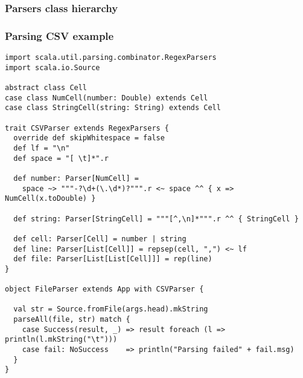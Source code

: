 \documentclass[t]{beamer}
\begin{document}
\begin{frame}
\frametitle{Parsers class hierarchy}
\end{frame}

\begin{frame}[fragile]
\frametitle{Parsing CSV example}
\begin{lstlisting}
import scala.util.parsing.combinator.RegexParsers
import scala.io.Source

abstract class Cell
case class NumCell(number: Double) extends Cell
case class StringCell(string: String) extends Cell

trait CSVParser extends RegexParsers {
  override def skipWhitespace = false
  def lf = "\n"
  def space = "[ \t]*".r

  def number: Parser[NumCell] =
    space ~> """-?\d+(\.\d*)?""".r <~ space ^^ { x => NumCell(x.toDouble) }

  def string: Parser[StringCell] = """[^,\n]*""".r ^^ { StringCell }

  def cell: Parser[Cell] = number | string
  def line: Parser[List[Cell]] = repsep(cell, ",") <~ lf
  def file: Parser[List[List[Cell]]] = rep(line)
}

object FileParser extends App with CSVParser {

  val str = Source.fromFile(args.head).mkString
  parseAll(file, str) match {
    case Success(result, _) => result foreach (l => println(l.mkString("\t")))
    case fail: NoSuccess    => println("Parsing failed" + fail.msg)
  }
}
\end{lstlisting}
\end{frame}
\end{document}
